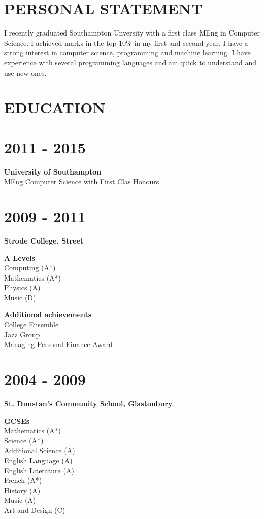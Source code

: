 \documentclass[margin]{res}
\begin{document}
\begin{resume}

\section{PERSONAL STATEMENT}
I recently graduated Southampton Unversity with a first class MEng in Computer
Science. I achieved marks in the top 10\% in my first and second year. I have a
strong interest in computer science, programming and machine learning. I have
experience with  several programming languages and am quick to understand and
use new ones.

\section{EDUCATION}
\normalsize{\section{2011 - 2015}}
{\bf University of Southampton} \\
MEng Computer Science with First Clas Honours \\
\normalsize{\section{2009 - 2011}}
{\bf Strode College, Street}

{\bf A Levels} \\
Computing (A*) \\
Mathematics (A*) \\
Physics (A) \\
Music (D)

{\bf Additional achievements} \\
College Ensemble \\
Jazz Group \\
Managing Personal Finance Award

\normalsize{\section{2004 - 2009}}
{\bf St. Dunstan's Community School, Glastonbury}

{\bf GCSEs} \\
Mathematics (A*) \\
Science (A*) \\
Additional Science (A) \\
English Language (A) \\
English Literature (A) \\
French (A*) \\
History (A) \\
Music (A) \\
Art and Design (C)


\end{resume}
\end{document}
